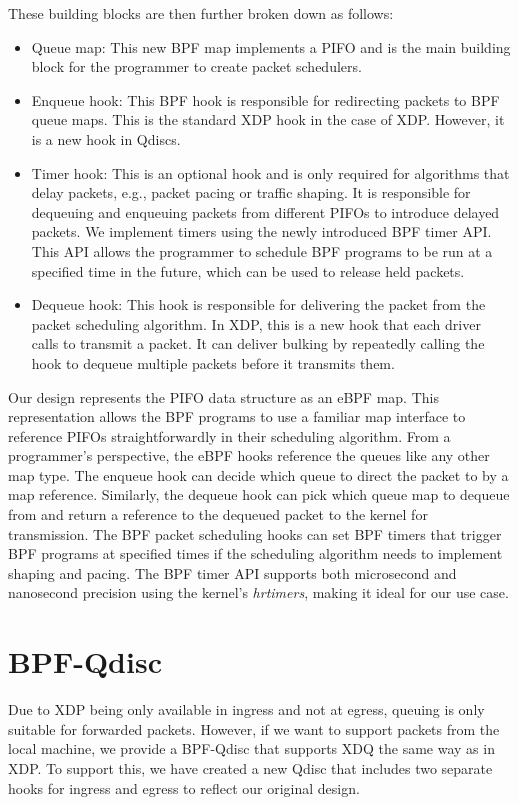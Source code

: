 \documentclass[sigconf, nonacm]{acmart}
\begin{document}
These building blocks are then further broken down as follows:

\begin{itemize}
        \item Queue map: This new BPF map implements a PIFO and is the main building block for the programmer to create packet schedulers.
        \item Enqueue hook: This BPF hook is responsible for redirecting packets to BPF queue maps. This is the standard XDP hook in the case of XDP. However, it is a new hook in Qdiscs.
        \item Timer hook: This is an optional hook and is only required for algorithms that delay packets, e.g., packet pacing or traffic shaping. It is responsible for dequeuing and enqueuing packets from different PIFOs to introduce delayed packets. We implement timers using the newly introduced BPF timer API. This API allows the programmer to schedule BPF programs to be run at a specified time in the future, which can be used to release held packets.
        \item Dequeue hook: This hook is responsible for delivering the packet from the packet scheduling algorithm. In XDP, this is a new hook that each driver calls to transmit a packet. It can deliver bulking by repeatedly calling the hook to dequeue multiple packets before it transmits them.
\end{itemize}

Our design represents the PIFO data structure as an eBPF map. This representation allows the BPF programs to use a familiar map interface to reference PIFOs straightforwardly in their scheduling algorithm. From a programmer's perspective, the eBPF hooks reference the queues like any other map type. The enqueue hook can decide which queue to direct the packet to by a map reference. Similarly, the dequeue hook can pick which queue map to dequeue from and return a reference to the dequeued packet to the kernel for transmission. The BPF packet scheduling hooks can set BPF timers that trigger BPF programs at specified times if the scheduling algorithm needs to implement shaping and pacing. The BPF timer API supports both microsecond and nanosecond precision using the kernel's \textit{hrtimers}, making it ideal for our use case.


\section{BPF-Qdisc}

Due to XDP being only available in ingress and not at egress, queuing is only suitable for forwarded packets. However, if we want to support packets from the local machine, we provide a BPF-Qdisc that supports XDQ the same way as in XDP. To support this, we have created a new Qdisc that includes two separate hooks for ingress and egress to reflect our original design.
\end{document}
